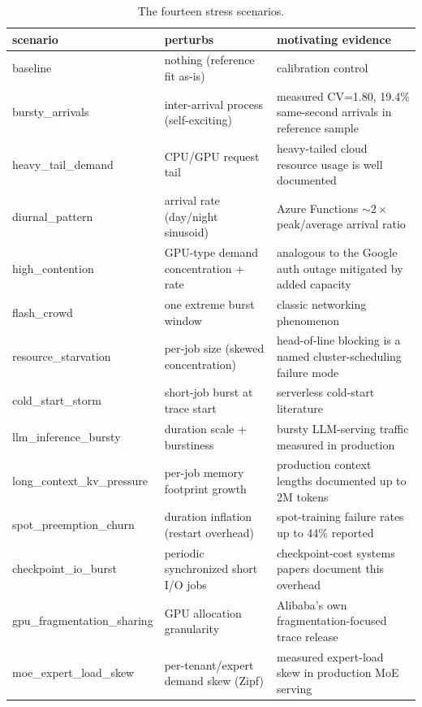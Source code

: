 \documentclass[12pt]{report}
\begin{document}
\begin{table}[h]
\centering
\caption{The fourteen stress scenarios.}
\label{tab:th-scenarios}
\scriptsize
\begin{tabular}{p{2.6cm}p{5.6cm}p{5.8cm}}
\toprule
scenario & perturbs & motivating evidence \\
\midrule
baseline & nothing (reference fit as-is) & calibration control \\
bursty\_arrivals & inter-arrival process (self-exciting) & measured CV=1.80, 19.4\% same-second arrivals in reference sample \\
heavy\_tail\_demand & CPU/GPU request tail & heavy-tailed cloud resource usage is well documented \citep{reiss2012} \\
diurnal\_pattern & arrival rate (day/night sinusoid) & Azure Functions $\sim2\times$ peak/average arrival ratio \citep{shahrad2020} \\
high\_contention & GPU-type demand concentration + rate & analogous to the Google auth outage mitigated by added capacity \citep{outagestats2025} \\
flash\_crowd & one extreme burst window & classic networking phenomenon \citep{shahrad2020} \\
resource\_starvation & per-job size (skewed concentration) & head-of-line blocking is a named cluster-scheduling failure mode \\
cold\_start\_storm & short-job burst at trace start & serverless cold-start literature \citep{shahrad2020} \\
llm\_inference\_bursty & duration scale + burstiness & bursty LLM-serving traffic measured in production \\
long\_context\_kv\_pressure & per-job memory footprint growth & production context lengths documented up to 2M tokens \\
spot\_preemption\_churn & duration inflation (restart overhead) & spot-training failure rates up to 44\% reported \\
checkpoint\_io\_burst & periodic synchronized short I/O jobs & checkpoint-cost systems papers document this overhead \\
gpu\_fragmentation\_sharing & GPU allocation granularity & Alibaba's own fragmentation-focused trace release \citep{alibabatrace2023} \\
moe\_expert\_load\_skew & per-tenant/expert demand skew (Zipf) & measured expert-load skew in production MoE serving \\
\bottomrule
\end{tabular}
\end{table}
\end{document}
